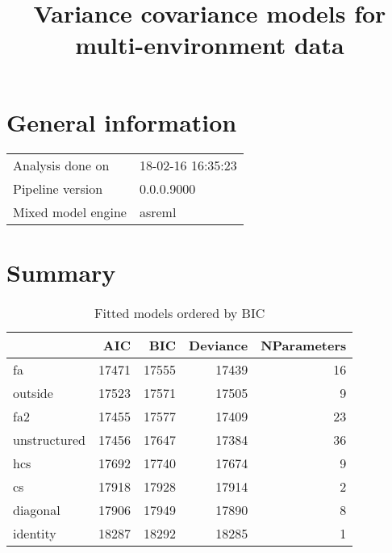 \documentclass[a4paper,11pt]{article}\usepackage[]{graphicx}\usepackage[]{color}
\title{Variance covariance models for multi-environment data}%
\author{\vspace{-5ex}}
\date{\vspace{-5ex}}
\begin{document}
\maketitle
\singlespacing

\section{General information}
\begin{table}[ht]
\begin{flushleft}
\begin{tabular}{ll}
  Analysis done on & 18-02-16 16:35:23 \\ 
  Pipeline version & 0.0.0.9000 \\ 
  Mixed model engine & asreml \\ 
  \end{tabular}
\label{general}
\end{flushleft}
\end{table}


\section{Summary}
\begin{table}[ht]
\begin{flushleft}
\caption{Fitted models ordered by BIC} 
\label{summary}
\begin{tabular}{lrrrr}
  \hline
 & AIC & BIC & Deviance & NParameters \\ 
  \hline
fa & 17471 & 17555 & 17439 & 16 \\ 
  outside & 17523 & 17571 & 17505 & 9 \\ 
  fa2 & 17455 & 17577 & 17409 & 23 \\ 
  unstructured & 17456 & 17647 & 17384 & 36 \\ 
  hcs & 17692 & 17740 & 17674 & 9 \\ 
  cs & 17918 & 17928 & 17914 & 2 \\ 
  diagonal & 17906 & 17949 & 17890 & 8 \\ 
  identity & 18287 & 18292 & 18285 & 1 \\ 
   \hline
\end{tabular}
\end{flushleft}
\end{table}
\end{document}
